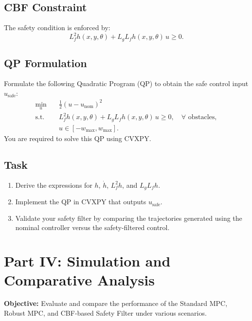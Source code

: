 \documentclass[11pt]{article}
\begin{document}
\subsection{CBF Constraint}
The safety condition is enforced by:
\[
L_f^2 h(x,y,\theta) + L_g L_f h(x,y,\theta) \, u \ge 0.
\]

\subsection{QP Formulation}
Formulate the following Quadratic Program (QP) to obtain the safe control input $u_{\text{safe}}$:
\[
\begin{aligned}
\min_{u} \quad & \frac{1}{2}(u - u_{\text{nom}})^2 \\
\text{s.t.} \quad & L_f^2 h(x,y,\theta) + L_g L_f h(x,y,\theta) \, u \ge 0, \quad \forall \text{ obstacles}, \\
& u \in [-w_{\max}, w_{\max}].
\end{aligned}
\]
You are required to solve this QP using CVXPY.

\subsection{Task}
\begin{enumerate}[label=\arabic*.]
    \item Derive the expressions for $h$, $\dot{h}$, $L_f^2h$, and $L_gL_fh$.
    \item Implement the QP in CVXPY that outputs $u_{\text{safe}}$.
    \item Validate your safety filter by comparing the trajectories generated using the nominal controller versus the safety-filtered control.
\end{enumerate}

\section{Part IV: Simulation and Comparative Analysis}
\textbf{Objective:} Evaluate and compare the performance of the Standard MPC, Robust MPC, and CBF-based Safety Filter under various scenarios.
\end{document}
